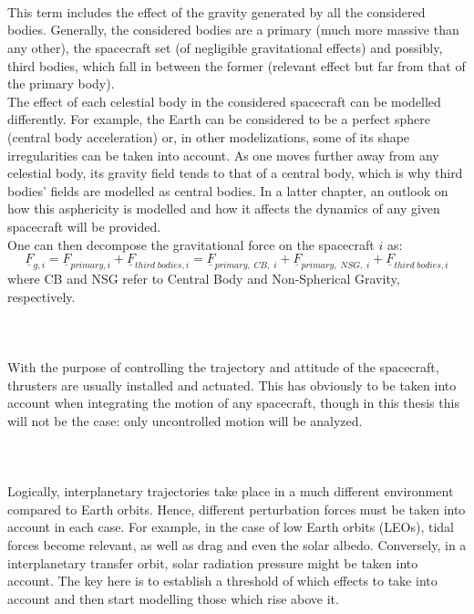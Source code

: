 			\paragraph{\\} 
			\indent This term includes the effect of the gravity generated by all the considered bodies. Generally, the considered bodies are a primary (much more massive than any other), the spacecraft set (of negligible gravitational effects) and possibly, third bodies, which fall in between the former (relevant effect but far from that of the primary body). \\
			\indent The effect of each celestial body in the considered spacecraft can be modelled differently. For example, the Earth can be considered to be a perfect sphere (central body acceleration) or, in other modelizations, some of its shape irregularities can be taken into account. As one moves further away from any celestial body, its gravity field tends to that of a central body, which is why third bodies' fields are modelled as central bodies. In a latter chapter, an outlook on how this asphericity is modelled and how it affects the dynamics of any given spacecraft will be provided. \\
			\indent One can then decompose the gravitational force on the spacecraft $i$ as:
			\[
			\underline{F}_{g, i} = \underline{F}_{primary, i} + \underline{F}_{third\; bodies, i} = \underline{F}_{primary, \;CB, \;i} + \underline{F}_{primary, \; NSG, \;i} + \underline{F}_{third\; bodies, i}
			\]
			\noindent where CB and NSG refer to Central Body and Non-Spherical Gravity, respectively.
			\paragraph{\\} 
			\indent With the purpose of controlling the trajectory and attitude of the spacecraft, thrusters are usually installed and actuated. This has obviously to be taken into account when integrating the motion of any spacecraft, though in this thesis this will not be the case: only uncontrolled motion will be analyzed.\\
			\paragraph{\\} 
			\indent Logically, interplanetary trajectories take place in a much different environment compared to Earth orbits. Hence, different perturbation forces must be taken into account in each case. For example, in the case of low Earth orbits (LEOs), tidal forces become relevant, as well as drag and even the solar albedo. Conversely, in a interplanetary transfer orbit, solar radiation pressure might be taken into account. The key here is to establish a threshold of which effects to take into account and then start modelling those which rise above it.\\
